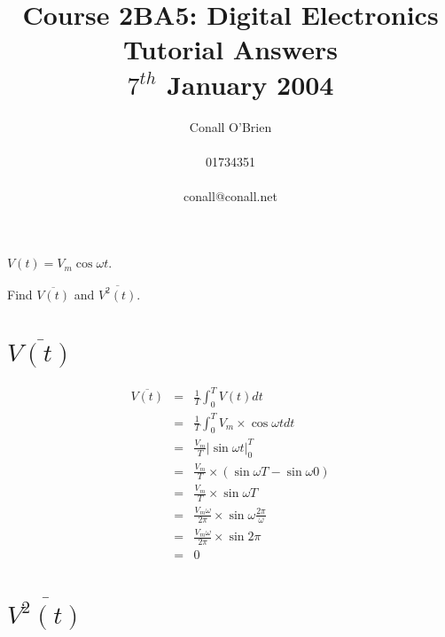 \documentclass[a4paper,12pt]{article}
\begin{document}
\title{Course 2BA5: Digital Electronics \\ Tutorial Answers \\ $7^{th}$ January 2004}

\author{Conall O'Brien \\ \\ 01734351 \\ \\ conall@conall.net}

\maketitle

\noindent $V(t) = V_{m} \cos\omega t$.

\vspace{5mm}

\noindent Find $\overline{V(t)}$ and $\overline{V^{2}(t)}$.

\section{$\overline{V(t)}$}

\begin{eqnarray*}
\overline{V(t)} & = & \frac{1}{T} \int^{T}_{0} V(t)  dt \\
					 & = & \frac{1}{T} \int^{T}_{0} V_{m} \times \cos\omega t dt \\
					 & = & \frac{V_{m}}{T} \left| \sin\omega t \right|^{T}_{0} \\
					 & = & \frac{V_{m}}{T} \times \left( \sin\omega T - \sin\omega 0 \right) \\
					 & = & \frac{V_{m}}{T} \times \sin\omega T \\
					 & = & \frac{V_{m} \omega}{2 \pi} \times \sin\omega \frac{2 \pi}{\omega} \\
					 & = & \frac{V_{m} \omega}{2 \pi} \times \sin2\pi \\
					 & = & 0
\end{eqnarray*}

\section{$\overline{V^{2}(t)}$}
\end{document}
